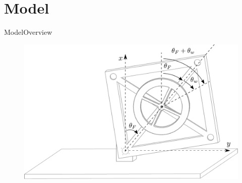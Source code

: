 \section{Model}

\begin{frame}{Model}{Overview}
	\begin{figure}[H]
		\centering
		\includegraphics[scale=0.5]{Pictures/mechanicalSystem.pdf}
	\end{figure}
\end{frame}

